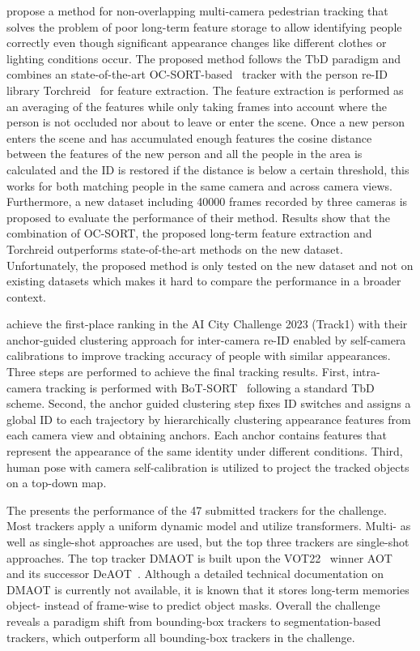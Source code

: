 \citeauthor{Huang23a} propose a method for non-overlapping multi-camera pedestrian tracking that solves the problem of poor long-term feature storage to allow identifying people correctly even though significant appearance changes like different clothes or lighting conditions occur. The proposed method follows the TbD paradigm and combines an state-of-the-art OC-SORT-based~\cite{Cao23} tracker with the person re-ID library Torchreid~\cite{Zhou19} for feature extraction. The feature extraction is performed as an averaging of the features while only taking frames into account where the person is not occluded nor about to leave or enter the scene. Once a new person enters the scene and has accumulated enough features the cosine distance between the features of the new person and all the people in the area is calculated and the ID is restored if the distance is below a certain threshold, this works for both matching people in the same camera and across camera views. Furthermore, a new dataset including 40000 frames recorded by three cameras is proposed to evaluate the performance of their method. Results show that the combination of OC-SORT, the proposed long-term feature extraction and Torchreid outperforms state-of-the-art methods on the new dataset. Unfortunately, the proposed method is only tested on the new dataset and not on existing datasets which makes it hard to compare the performance in a broader context.

\textcite{Huang23b} achieve the first-place ranking in the AI City Challenge 2023 (Track1) with their anchor-guided clustering approach for inter-camera re-ID enabled by self-camera calibrations to improve tracking accuracy of people with similar appearances. Three steps are performed to achieve the final tracking results. First, intra-camera tracking is performed with BoT-SORT~\cite{Aharon22} following a standard TbD scheme. Second, the anchor guided clustering step fixes ID switches and assigns a global ID to each trajectory by hierarchically clustering appearance features from each camera view and obtaining anchors. Each anchor contains features that represent the appearance of the same identity under different conditions. Third, human pose with camera self-calibration is utilized to project the tracked objects on a top-down map.

The  presents the performance of the 47 submitted trackers for the challenge. Most trackers apply a uniform dynamic model and utilize transformers.
Multi- as well as single-shot approaches are used, but the top three trackers are single-shot approaches. The top tracker DMAOT is built upon the VOT22~\cite{Kristan22} winner AOT~\cite{Yang21} and its successor DeAOT~\cite{Yang22b}. Although a detailed technical documentation on DMAOT is currently not available, it is known that it stores long-term memories object- instead of frame-wise to predict object masks. Overall the challenge reveals a paradigm shift from bounding-box trackers to segmentation-based trackers, which outperform all bounding-box trackers in the challenge.

